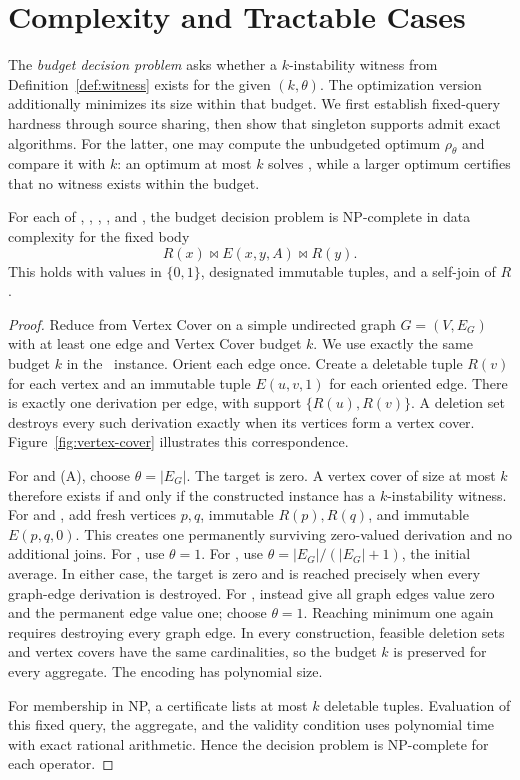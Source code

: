 \section{Complexity and Tractable Cases}
\label{sec:complexity}

The \emph{budget decision problem} asks whether a $k$-instability witness
from Definition~\ref{def:witness} exists for the given $(k,\theta)$.
The optimization version additionally minimizes its size within that
budget. We first establish fixed-query hardness through source sharing,
then show that singleton supports admit exact algorithms. For the latter,
one may compute the unbudgeted optimum $\rho_\theta$ and compare it
with $k$: an optimum at most $k$ solves \MIW, while a larger optimum
certifies that no witness exists within the budget.

\begin{theorem}
\label{thm:hardness}
For each of , , , , and ,
the budget decision problem is NP-complete in data complexity for the
fixed body
\[
R(x)\Join E(x,y,A)\Join R(y).
\]
This holds with values in $\{0,1\}$, designated immutable tuples, and a
self-join of $R$.
\end{theorem}


\begin{proof}
Reduce from Vertex Cover on a simple undirected graph $G=(V,E_G)$ with
at least one edge and Vertex Cover budget $k$. We use exactly the same
budget $k$ in the \MIW\ instance. Orient each edge once. Create a deletable tuple $R(v)$
for each vertex and an immutable tuple $E(u,v,1)$ for each oriented edge.
There is exactly one derivation per edge, with support
$\{R(u),R(v)\}$. A deletion set destroys every such derivation exactly
when its vertices form a vertex cover. Figure~\ref{fig:vertex-cover}
illustrates this correspondence.

For  and (A), choose $\theta=|E_G|$. The target
is zero. A vertex cover of size at most $k$ therefore exists if and only
if the constructed instance has a $k$-instability witness. For  and
, add fresh vertices $p,q$, immutable $R(p),R(q)$, and
immutable $E(p,q,0)$. This creates one permanently surviving zero-valued
derivation and no additional joins. For , use $\theta=1$.
For , use $\theta=|E_G|/(|E_G|+1)$, the initial average.
In either case, the target is zero and is reached precisely when every
graph-edge derivation is destroyed. For , instead give all
graph edges value zero and the permanent edge value one; choose
$\theta=1$. Reaching minimum one again requires destroying every graph
edge. In every construction, feasible deletion sets and vertex covers
have the same cardinalities, so the budget $k$ is preserved for every
aggregate. The encoding has polynomial size.

For membership in NP, a certificate lists at most $k$ deletable tuples.
Evaluation of this fixed query, the aggregate, and the validity condition
uses polynomial time with exact rational arithmetic. Hence the decision
problem is NP-complete for each operator.
\end{proof}

